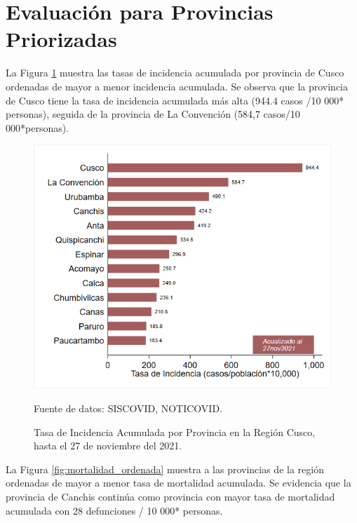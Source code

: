 \documentclass[12pt,a4paper,openany]{book}
\begin{document}

\clearpage

	\section*{Evaluación para Provincias Priorizadas}
\noindent La Figura \ref{fig:incidencia_provincias} muestra las tasas de incidencia acumulada por provincia de Cusco ordenadas de mayor a menor incidencia acumulada. Se observa que la provincia de Cusco tiene la tasa de incidencia acumulada más alta (944.4 casos /10 000* personas), seguida de la provincia de La Convención (584,7 casos/10 000*personas).

\begin{figure}[!htpb]
	\caption{Tasa de Incidencia Acumulada por Provincia en la Región Cusco, hasta el 27 de noviembre del 2021. }\label{fig:incidencia_provincias}
	\begin{center}
		\includegraphics[width=0.75\linewidth]{../figuras/incidencia_provincial}
	\end{center}
	{\footnotesize {Fuente de datos: SISCOVID, NOTICOVID.}}
\end{figure}


La Figura \ref{fig:mortalidad_ordenada} muestra a las provincias de la región ordenadas de mayor a menor tasa de mortalidad acumulada. Se evidencia que la provincia de Canchis continúa como provincia con mayor tasa de mortalidad acumulada con 28 defunciones / 10 000* personas.  
\end{document}
